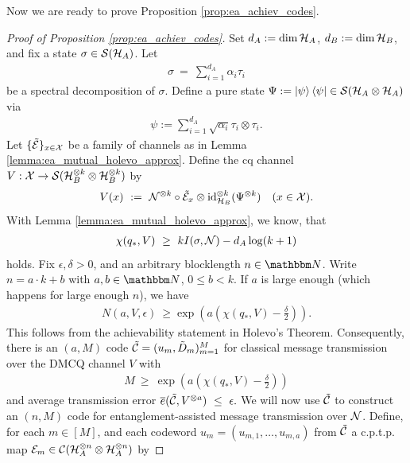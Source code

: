 Now we are ready to prove Proposition \ref{prop:ea_achiev_codes}. 
\begin{proof}[Proof of Proposition \ref{prop:ea_achiev_codes}]
Set $d_A := \dim {\mathcal H}_A$, $d_B := \dim {\mathcal H}_B$, and fix a state $\sigma \in {\mathcal S}({\mathcal H}_A)$. Let
\begin{align*}
\sigma \ = \ \sum_{i=1}^{d_A} \alpha_i \tau_i
\end{align*}
be a spectral decomposition of $\sigma$. Define a pure state $\Psi := \ket{\psi}\bra{\psi} 
\in {\mathcal S}({\mathcal H}_A \otimes {\mathcal H}_A)$ via
\begin{align*}
\psi := \sum_{i=1}^{d_A} \sqrt{\alpha_i} \tau_i \otimes \tau_i.
\end{align*}
Let $\{\tilde{{\mathcal E}}\}_{x \in {\mathcal X}}$ be a family of channels as in Lemma \ref{lemma:ea_mutual_holevo_approx}. Define the cq channel $V: {\mathcal X} \rightarrow {\mathcal S}({\mathcal H}_B^{\otimes k}\otimes {\mathcal H}_B^{\otimes k})$ by
\begin{align*}
V(x) \ := \ {\mathcal N}^{\otimes k} \circ \tilde{{\mathcal E}}_x \otimes \mathrm{id}_{{\mathcal H}_B}^{\otimes k}(\Psi^{\otimes k})&& (x \in {\mathcal X}).
\end{align*}
With Lemma \ref{lemma:ea_mutual_holevo_approx}, we know, that 
\begin{align*}
\chi(q_\ast,V) \ \geq \ k I(\sigma,{\mathcal N}) - d_A \log(k+1)
\end{align*}
holds. \newline 
Fix $\epsilon, \delta > 0$, and an arbitrary blocklength $n \in \bbmN$. Write $n = a\cdot k + b$ with $a, b \in \bbmN$, $0 \leq b < k$. If $a$ is large enough (which happens for large enough $n$), we have
\begin{align*}
 N(a, V, \epsilon) \ \geq \exp(a (\chi(q_\ast, V)- \frac{\delta}{2})).
\end{align*}
This follows from the achievability statement in Holevo's Theorem. Consequently, there is an $(a,M)$ code $\tilde{{\mathcal C}} = (u_m, \tilde{D}_m)_{m=1}^M$ for classical message transmission over the DMCQ channel $V$ with 
\begin{align*}
 M \ \geq \ \exp\left(a(\chi(q_\ast, V) -\frac{\delta}{2})\right)
\end{align*}
and average transmission error
$
\overline{e}(\tilde{{\mathcal C}}, V^{\otimes a}) \ \leq \ \epsilon.
$
We will now use $\tilde{{\mathcal C}}$ to construct an $(n,M)$ code for entanglement-assisted message transmission over ${\mathcal N}$. \newline 
Define, for each $m \in [M]$, and each codeword  $u_m = (u_{m,1},\dots, u_{m,a})$ from $\tilde{{\mathcal C}}$ a c.p.t.p. map ${\mathcal E}_m \in {\mathcal C}({\mathcal H}_A^{\otimes n} \otimes {\mathcal H}_A^{\otimes n})$ by

\end{proof}
